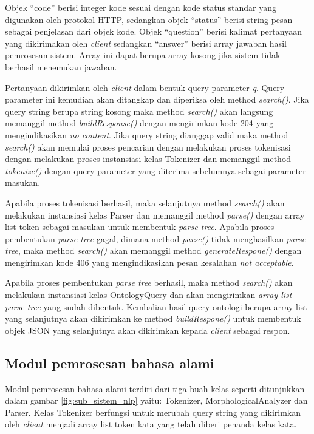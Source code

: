 Objek ``code'' berisi integer kode sesuai dengan kode status standar yang digunakan oleh protokol HTTP, sedangkan objek ``status'' berisi string pesan sebagai penjelasan dari objek kode. Objek ``question'' berisi kalimat pertanyaan yang dikirimakan oleh \emph{client} sedangkan ``answer'' berisi array jawaban hasil pemrosesan sistem. Array ini dapat berupa array kosong jika sistem tidak berhasil menemukan jawaban.

Pertanyaan dikirimkan oleh \emph{client} dalam bentuk query parameter \emph{q}. Query parameter ini kemudian akan ditangkap dan diperiksa oleh method \emph{search()}. Jika query string berupa string kosong maka method \emph{search()} akan langsung memanggil method \emph{buildResponse()} dengan mengirimkan kode 204 yang mengindikasikan \emph{no content}. Jika query string dianggap valid maka method \emph{search()} akan memulai proses pencarian dengan melakukan proses tokenisasi dengan melakukan proses instansiasi kelas Tokenizer dan memanggil method \emph{tokenize()} dengan query parameter yang diterima sebelumnya sebagai parameter masukan. 

Apabila proses tokenisasi berhasil, maka selanjutnya method \emph{search()} akan melakukan instansiasi kelas Parser dan memanggil method \emph{parse()} dengan array list token sebagai masukan untuk membentuk \emph{parse tree}. Apabila proses pembentukan \emph{parse tree} gagal, dimana method \emph{parse()} tidak menghasilkan \emph{parse tree}, maka method \emph{search()} akan memanggil method \emph{generateRespone()} dengan mengirimkan kode 406 yang mengindikasikan pesan kesalahan \emph{not acceptable}.

Apabila proses pembentukan \emph{parse tree} berhasil, maka method \emph{search()} akan melakukan instansiasi kelas OntologyQuery dan akan mengirimkan \emph{array list parse tree} yang sudah dibentuk. Kembalian hasil query ontologi berupa array list yang selanjutnya akan dikirimkan ke method \emph{buildRespone()} untuk membentuk objek JSON yang selanjutnya akan dikirimkan kepada \emph{client} sebagai respon.


\subsection{Modul pemrosesan bahasa alami}
Modul pemrosesan bahasa alami terdiri dari tiga buah kelas seperti ditunjukkan dalam gambar \ref{fig:sub_sistem_nlp} yaitu: Tokenizer, MorphologicalAnalyzer dan Parser. Kelas Tokenizer berfungsi untuk merubah query string yang dikirimkan oleh \emph{client} menjadi array list token kata yang telah diberi penanda kelas kata.

